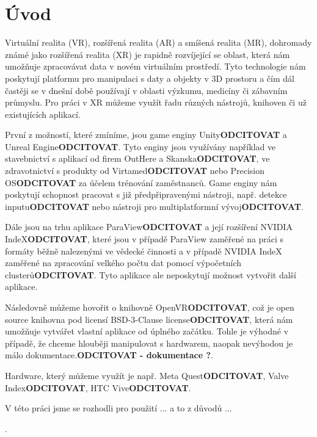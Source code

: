 \documentclass[czech]{article}
\begin{document}
\section{Úvod}
\par{Virtuální realita (VR), rozšířená realita (AR) a smíšená realita (MR), dohromady známé jako rozšířená realita (XR) je rapidně rozvíjející se oblast, která nám umožňuje zpracovávat data v novém virtuálním prostředí. Tyto technologie nám poskytují platformu pro manipulaci s daty a objekty v 3D prostoru a čím dál častěji se v dnešní době používají v oblasti výzkumu, medicíny či zábavním průmyslu. Pro práci v XR můžeme využít řadu různých nástrojů, knihoven či už existujících aplikací.}
\par{První z možností, které zmíníme, jsou game enginy Unity\textbf{ODCITOVAT} a Unreal Engine\textbf{ODCITOVAT}. Tyto enginy jsou využívány například ve stavebnictví s aplikací od firem OutHere a Skanska\textbf{ODCITOVAT}, ve zdravotnictví s produkty od Virtamed\textbf{ODCITOVAT} nebo Precision OS\textbf{ODCITOVAT} za účelem trénování zaměstnanců. Game enginy nám poskytují schopnost pracovat s již předpřipravenými nástroji, např. detekce inputu\textbf{ODCITOVAT} nebo nástroji pro multiplatformní vývoj\textbf{ODCITOVAT}.}
\par{Dále jsou na trhu aplikace ParaView\textbf{ODCITOVAT} a její rozšíření NVIDIA IndeX\textbf{ODCITOVAT}, které jsou v případě ParaView zaměřené na práci s formáty běžně nalezenými ve vědecké činnosti a v případě NVIDIA IndeX zaměřené na zpracování velkého počtu dat pomocí výpočetních clusterů\textbf{ODCITOVAT}. Tyto aplikace ale neposkytují možnost vytvořit další aplikace.}
\par{Následovně můžeme hovořit o knihovně OpenVR\textbf{ODCITOVAT}, což je open source knihovna pod licensí BSD-3-Clause license\textbf{ODCITOVAT}, která nám umožňuje vytvářet vlastní aplikace od úplného začátku. Tohle je výhodné v případě, že chceme hlouběji manipulovat s hardwarem, naopak nevýhodou je málo dokumentace.\textbf{ODCITOVAT - dokumentace ?}.}
\par{Hardware, který můžeme využít je např. Meta Quest\textbf{ODCITOVAT}, Valve Index\textbf{ODCITOVAT}, HTC Vive\textbf{ODCITOVAT}.}
\par{V této práci jsme se rozhodli pro použití ... a to z důvodů ...}
\par{.}


\newpage
\printbibliography
\end{document}
